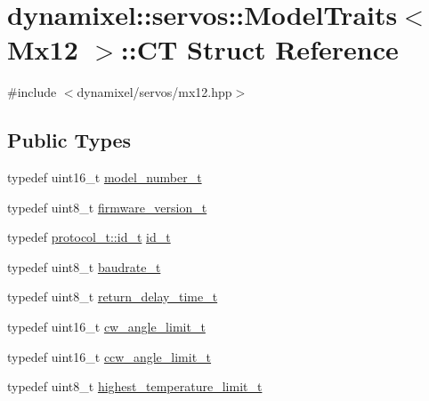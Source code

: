 \hypertarget{structdynamixel_1_1servos_1_1_model_traits_3_01_mx12_01_4_1_1_c_t}{}\section{dynamixel\+:\+:servos\+:\+:Model\+Traits$<$ Mx12 $>$\+:\+:CT Struct Reference}
\label{structdynamixel_1_1servos_1_1_model_traits_3_01_mx12_01_4_1_1_c_t}


{\ttfamily \#include $<$dynamixel/servos/mx12.\+hpp$>$}

\subsection*{Public Types}
\begin{DoxyCompactItemize}
\item 
typedef uint16\+\_\+t \hyperlink{structdynamixel_1_1servos_1_1_model_traits_3_01_mx12_01_4_1_1_c_t_aa49ded417f5eb4ce0635e9ae1e7f7e98}{model\+\_\+number\+\_\+t}
\item 
typedef uint8\+\_\+t \hyperlink{structdynamixel_1_1servos_1_1_model_traits_3_01_mx12_01_4_1_1_c_t_aa6e7428ef9843550bcd287a50b297e04}{firmware\+\_\+version\+\_\+t}
\item 
typedef \hyperlink{classdynamixel_1_1protocols_1_1_protocol1_a1d4dfa22b01f80b1876d14f539d52b5c}{protocol\+\_\+t\+::id\+\_\+t} \hyperlink{structdynamixel_1_1servos_1_1_model_traits_3_01_mx12_01_4_1_1_c_t_adaa72c9dcb7adcf260b4603d5754f018}{id\+\_\+t}
\item 
typedef uint8\+\_\+t \hyperlink{structdynamixel_1_1servos_1_1_model_traits_3_01_mx12_01_4_1_1_c_t_a4317682b778a887ec8ca06082d4ffd19}{baudrate\+\_\+t}
\item 
typedef uint8\+\_\+t \hyperlink{structdynamixel_1_1servos_1_1_model_traits_3_01_mx12_01_4_1_1_c_t_a12bd046468fce71ae7ab82b058a5f610}{return\+\_\+delay\+\_\+time\+\_\+t}
\item 
typedef uint16\+\_\+t \hyperlink{structdynamixel_1_1servos_1_1_model_traits_3_01_mx12_01_4_1_1_c_t_ab918f9d168fa3d072953a3a0a8b2351b}{cw\+\_\+angle\+\_\+limit\+\_\+t}
\item 
typedef uint16\+\_\+t \hyperlink{structdynamixel_1_1servos_1_1_model_traits_3_01_mx12_01_4_1_1_c_t_a1162e36769e164a1dda04a830642acb4}{ccw\+\_\+angle\+\_\+limit\+\_\+t}
\item 
typedef uint8\+\_\+t \hyperlink{structdynamixel_1_1servos_1_1_model_traits_3_01_mx12_01_4_1_1_c_t_a1ad58c27476d8ecd28ec9a4127b48802}{highest\+\_\+temperature\+\_\+limit\+\_\+t}

\end{DoxyCompactItemize}

